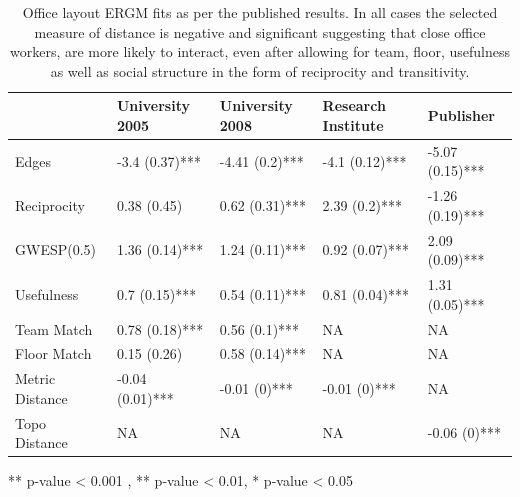 \documentclass[
]{statsoc}
\begin{document}
\begin{table}

\caption{\label{tab:unnamed-chunk-2}\label{tab:sailer_ergm_pub} Office layout ERGM fits as per the published results. In all cases the selected measure of distance is negative and significant suggesting that close office workers, are more likely to interact, even after allowing for team, floor, usefulness as well as social structure in the form of reciprocity and transitivity.}
\centering
\begin{threeparttable}
\begin{tabular}[t]{lllll}
\toprule
  & University 2005 & University 2008 & Research Institute & Publisher\\
\midrule
\rowcolor{gray!6}  Edges & -3.4 (0.37)*** & -4.41 (0.2)*** & -4.1 (0.12)*** & -5.07 (0.15)***\\
Reciprocity & 0.38 (0.45) & 0.62 (0.31)*** & 2.39 (0.2)*** & -1.26 (0.19)***\\
\rowcolor{gray!6}  GWESP(0.5) & 1.36 (0.14)*** & 1.24 (0.11)*** & 0.92 (0.07)*** & 2.09 (0.09)***\\
Usefulness & 0.7 (0.15)*** & 0.54 (0.11)*** & 0.81 (0.04)*** & 1.31 (0.05)***\\
\rowcolor{gray!6}  Team Match & 0.78 (0.18)*** & 0.56 (0.1)*** & NA & NA\\
\addlinespace
Floor Match & 0.15 (0.26) & 0.58 (0.14)*** & NA & NA\\
\rowcolor{gray!6}  Metric Distance & -0.04 (0.01)*** & -0.01 (0)*** & -0.01 (0)*** & NA\\
Topo Distance & NA & NA & NA & -0.06 (0)***\\
\bottomrule
\end{tabular}
\begin{tablenotes}
\item *** p-value < 0.001 , ** p-value < 0.01, * p-value < 0.05
\end{tablenotes}
\end{threeparttable}
\end{table}
\end{document}
